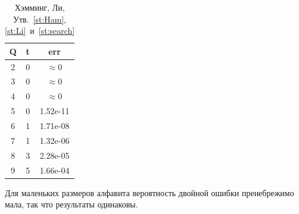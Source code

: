 \begin{table}[h]
	\caption{Хэмминг, Ли, Утв.~\ref{st:Ham},\ref{st:Li}~и~\ref{st:search}}
	\centering
	\begin{tabular}{|c|c|c|}
		\hline Q & t & err \\ \hline
		2 & 0 & $\approx 0$ \\ \hline
		3 & 0 & $\approx 0$ \\ \hline
		4 & 0 & $\approx 0$ \\ \hline
		5 & 0 & 1.52e-11 \\ \hline
		6 & 1 & 1.71e-08 \\ \hline
		7 & 1 & 1.32e-06 \\ \hline
		8 & 3 & 2.28e-05 \\ \hline
		9 & 5 & 1.66e-04 \\ \hline
	\end{tabular}
\end{table}

Для маленьких размеров алфавита вероятность двойной ошибки пренебрежимо мала, так что результаты одинаковы.

